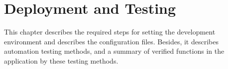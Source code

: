 \chapter{Deployment and Testing}\label{ch:mobile-application-implementation}

This chapter describes the required steps for setting the development environment and describes the configuration files.
Besides, it describes automation testing methods, and a summary of verified functions in the application by these testing methods.







